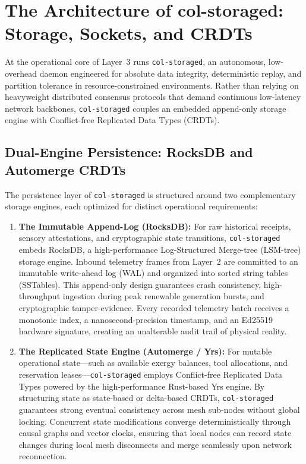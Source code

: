 \section{The Architecture of col-storaged: Storage, Sockets, and CRDTs}
\label{sec:l3-architecture}

At the operational core of Layer~3 runs \texttt{col-storaged}, an autonomous, low-overhead daemon engineered for absolute data integrity, deterministic replay, and partition tolerance in resource-constrained environments. Rather than relying on heavyweight distributed consensus protocols that demand continuous low-latency network backbones, \texttt{col-storaged} couples an embedded append-only storage engine with Conflict-free Replicated Data Types (CRDTs).

\subsection{Dual-Engine Persistence: RocksDB and Automerge CRDTs}

The persistence layer of \texttt{col-storaged} is structured around two complementary storage engines, each optimized for distinct operational requirements:

\begin{enumerate}
  \item \textbf{The Immutable Append-Log (RocksDB):} For raw historical receipts, sensory attestations, and cryptographic state transitions, \texttt{col-storaged} embeds RocksDB, a high-performance Log-Structured Merge-tree (LSM-tree) storage engine. Inbound telemetry frames from Layer~2 are committed to an immutable write-ahead log (WAL) and organized into sorted string tables (SSTables). This append-only design guarantees crash consistency, high-throughput ingestion during peak renewable generation bursts, and cryptographic tamper-evidence. Every recorded telemetry batch receives a monotonic index, a nanosecond-precision timestamp, and an Ed25519 hardware signature, creating an unalterable audit trail of physical reality.
  \item \textbf{The Replicated State Engine (Automerge / Yrs):} For mutable operational state---such as available exergy balances, tool allocations, and reservation leases---\texttt{col-storaged} employs Conflict-free Replicated Data Types powered by the high-performance Rust-based Yrs engine. By structuring state as state-based or delta-based CRDTs, \texttt{col-storaged} guarantees strong eventual consistency across mesh sub-nodes without global locking. Concurrent state modifications converge deterministically through causal graphs and vector clocks, ensuring that local nodes can record state changes during local mesh disconnects and merge seamlessly upon network reconnection.
\end{enumerate}

